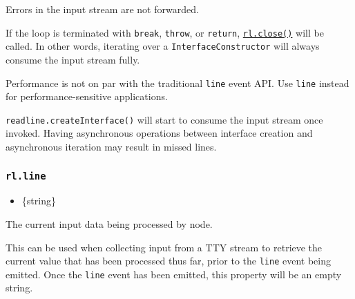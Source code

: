 Errors in the input stream are not forwarded.

If the loop is terminated with \texttt{break}, \texttt{throw}, or
\texttt{return}, \hyperref[rlclose]{\texttt{rl.close()}} will be called.
In other words, iterating over a \texttt{InterfaceConstructor} will
always consume the input stream fully.

Performance is not on par with the traditional
\texttt{\textquotesingle{}line\textquotesingle{}} event API. Use
\texttt{\textquotesingle{}line\textquotesingle{}} instead for
performance-sensitive applications.

\begin{Shaded}
\begin{Highlighting}[]
  \NormalTok{() \{}
  \OperatorTok{=}\NormalTok{(\{}
\NormalTok{  \})}\OperatorTok{;}

   \NormalTok{ (}
\NormalTok{  \}}
\NormalTok{\}}
\end{Highlighting}
\end{Shaded}

\texttt{readline.createInterface()} will start to consume the input
stream once invoked. Having asynchronous operations between interface
creation and asynchronous iteration may result in missed lines.

\subsubsection{\texorpdfstring{\texttt{rl.line}}{rl.line}}\label{rl.line}

\begin{itemize}
\tightlist
\item
  \{string\}
\end{itemize}

The current input data being processed by node.

This can be used when collecting input from a TTY stream to retrieve the
current value that has been processed thus far, prior to the
\texttt{line} event being emitted. Once the \texttt{line} event has been
emitted, this property will be an empty string.

